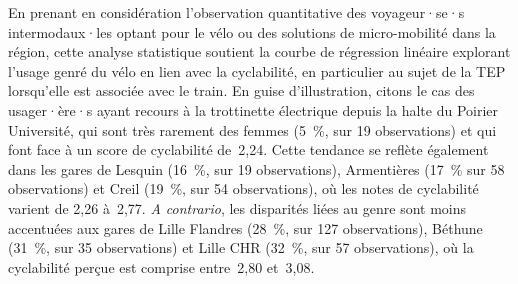 \begin{refsegment}
En prenant en considération l'observation quantitative des voyageur·se·s intermodaux·les optant pour le vélo ou des solutions de micro-mobilité dans la région, cette analyse statistique soutient la courbe de régression linéaire explorant l'usage genré du vélo en lien avec la cyclabilité, en particulier au sujet de la \acrshort{TEP} lorsqu'elle est associée avec le train. En guise d'illustration, citons le cas des usager·ère·s ayant recours à la trottinette électrique depuis la halte du Poirier Université, qui sont très rarement des femmes (5~\%, sur 19 observations) et qui font face à un score de cyclabilité de~2,24. Cette tendance se reflète également dans les gares de Lesquin (16~\%, sur 19 observations), Armentières (17~\% sur 58 observations) et Creil (19~\%, sur 54 observations), où les notes de cyclabilité varient de 2,26 à~2,77. \textsl{A contrario}, les disparités liées au genre sont moins accentuées aux gares de Lille Flandres (28~\%, sur 127 observations), Béthune (31~\%, sur 35 observations) et Lille CHR (32~\%, sur 57 observations), où la cyclabilité perçue est comprise entre~2,80 et~3,08.


\end{refsegment}
